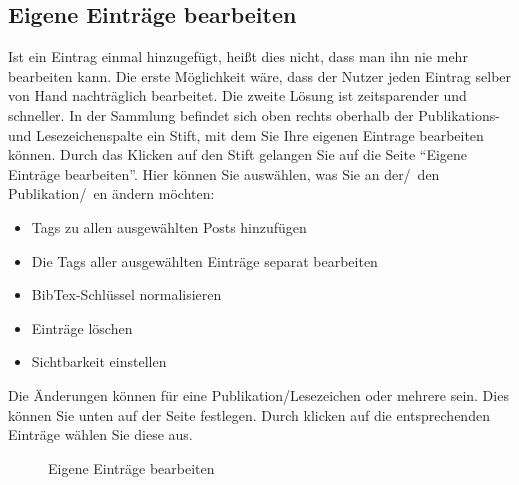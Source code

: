 \begin{description}
\subsection{Eigene Einträge bearbeiten}
Ist ein Eintrag einmal hinzugefügt, heißt dies nicht, dass man ihn nie mehr bearbeiten kann. Die erste Möglichkeit wäre, dass der Nutzer jeden Eintrag selber von Hand nachträglich bearbeitet. Die zweite Lösung ist zeitsparender und schneller.\newline
In der Sammlung befindet sich oben rechts oberhalb der Publikations- und Lesezeichenspalte ein Stift, mit dem Sie Ihre eigenen Eintrage bearbeiten können. Durch das Klicken auf den Stift gelangen Sie auf die Seite \enquote{Eigene Einträge bearbeiten}. Hier können Sie auswählen, was Sie an der/~den Publikation/~en ändern möchten:
\begin{itemize}
\item Tags zu allen ausgewählten Posts hinzufügen
\item Die Tags aller ausgewählten Einträge separat bearbeiten
\item BibTex-Schlüssel normalisieren
\item Einträge löschen
\item Sichtbarkeit einstellen
\end{itemize}
Die Änderungen können für eine Publikation/Lesezeichen oder mehrere sein. Dies können Sie unten auf der Seite festlegen. Durch klicken auf die entsprechenden Einträge wählen Sie diese aus.
\begin{figure}[h!]
 \centering
 \caption{Eigene Einträge bearbeiten}
 \label{figure030}
\end{figure}

\end{description}
